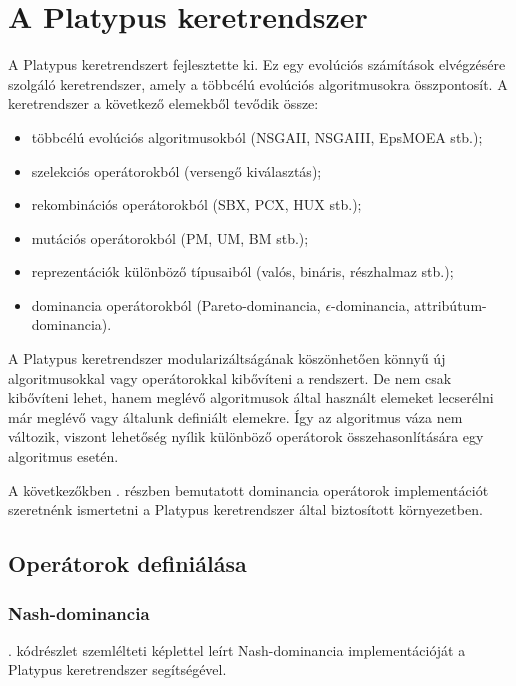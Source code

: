 \section{A Platypus keretrendszer}\label{sec:PLATYPUS_FRAMEWORK}


A Platypus keretrendszert  fejlesztette ki.
Ez egy evolúciós számítások elvégzésére szolgáló keretrendszer, amely a többcélú evolúciós algoritmusokra összpontosít.
A keretrendszer a következő elemekből tevődik össze:

\begin{itemize}
  \itemsep-0.17em
  \item[\textbullet] többcélú evolúciós algoritmusokból (NSGAII, NSGAIII, EpsMOEA stb.);
  \item[\textbullet] szelekciós operátorokból (versengő kiválasztás);
  \item[\textbullet] rekombinációs operátorokból (SBX, PCX, HUX stb.);
  \item[\textbullet] mutációs operátorokból (PM, UM, BM stb.);
  \item[\textbullet] reprezentációk különböző típusaiból (valós, bináris, részhalmaz stb.);
  \item[\textbullet] dominancia operátorokból (Pareto-dominancia, $\epsilon$-dominancia, attribútum-dominancia).
\end{itemize}

A Platypus keretrendszer modularizáltságának köszönhetően könnyű új algoritmusokkal vagy operátorokkal kibővíteni a rendszert.
De nem csak kibővíteni lehet, hanem meglévő algoritmusok által használt elemeket lecserélni már meglévő vagy általunk definiált elemekre.
Így az algoritmus váza nem változik, viszont lehetőség nyílik különböző operátorok összehasonlítására egy algoritmus esetén.

A következőkben . részben bemutatott dominancia operátorok implementációt szeretnénk ismertetni a Platypus keretrendszer által biztosított környezetben.

\subsection{Operátorok definiálása}


\subsubsection{Nash-dominancia}
. kódrészlet szemlélteti  képlettel leírt Nash-dominancia implementációját a Platypus keretrendszer segítségével.

